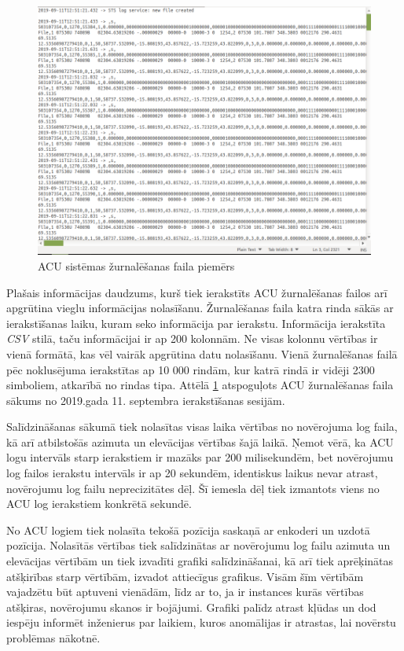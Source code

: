 \begin{figure}[h!]
\centering
\includegraphics[width=\textwidth]{images/created/acu-img.png}
\caption{ACU sistēmas žurnalēšanas faila piemērs}
\label{fig:acu-example}
\end{figure}

Plašais informācijas daudzums, kurš tiek ierakstīts ACU žurnalēšanas failos arī apgrūtina vieglu informācijas nolasīšanu. Žurnalēšanas faila katra rinda sākās ar ierakstīšanas laiku, kuram seko informācija par ierakstu. Informācija ierakstīta \textit{CSV} stilā, taču informācijai ir ap 200 kolonnām. Ne visas kolonnu vērtības ir vienā formātā, kas vēl vairāk apgrūtina datu nolasīšanu. Vienā žurnalēšanas failā pēc noklusējuma ierakstītas ap 10 000 rindām, kur katrā rindā ir vidēji 2300 simboliem, atkarībā no rindas tipa. Attēlā \ref{fig:acu-example} atspoguļots ACU žurnalēšanas faila sākums no 2019.gada 11. septembra ierakstīšanas sesijām.

Salīdzināšanas sākumā tiek nolasītas visas laika vērtības no novērojuma log faila, kā arī atbilstošās azimuta un elevācijas vērtības šajā laikā. Ņemot vērā, ka ACU logu intervāls starp ierakstiem ir mazāks par 200 milisekundēm, bet novērojumu log failos ierakstu intervāls ir ap 20 sekundēm, identiskus laikus nevar atrast, novērojumu log failu neprecizitātes dēļ. Šī iemesla dēļ tiek izmantots viens no ACU log ierakstiem konkrētā sekundē.  


No ACU logiem tiek nolasīta tekošā pozīcija saskaņā ar enkoderi un uzdotā pozīcija. Nolasītās vērtības tiek salīdzinātas ar novērojumu log failu azimuta un elevācijas vērtībām un tiek izvadīti grafiki salīdzināšanai, kā arī tiek aprēķinātas atšķirības starp vērtībām, izvadot attiecīgus grafikus. Visām šīm vērtībām vajadzētu būt aptuveni vienādām, līdz ar to, ja ir instances kurās vērtības atšķiras, novērojumu skanos ir bojājumi. Grafiki palīdz atrast kļūdas un dod iespēju informēt inženierus par laikiem, kuros anomālijas ir atrastas, lai novērstu problēmas nākotnē.

